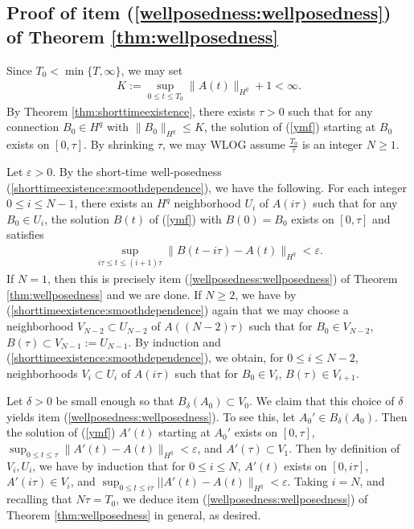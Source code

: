 \documentclass[12pt]{amsart}
\renewcommand{\1}{{\mathbf 1}}
\theoremstyle{others}
\numberwithin{equation}{section}
\begin{document}
\subsection{Proof of item (\ref{wellposedness:wellposedness}) of Theorem \ref{thm:wellposedness}} \label{item1proof}
 Since \(T_0 < \min\{T, \infty\}\), we may set
   \begin{align*}
       K := \sup_{0 \leq t \leq T_0} \|A(t)\|_{H^q}+1 < \infty.
   \end{align*} By Theorem \ref{thm:shorttimeexistence}, there exists \(\tau > 0\) such that for any connection \(B_0 \in H^q\) with \(\|B_0\|_{H^q} \leq K\), the solution of (\ref{ymf}) starting at \(B_0\) exists on \([0, \tau]\). By shrinking \(\tau\), we may WLOG assume \(\frac{T_0}{\tau}\) is an integer \(N \geq 1\). \par 
   Let \(\varepsilon > 0\). By the short-time well-posedness (\ref{shorttimeexistence:smoothdependence}),  we have the following. For each integer \(0 \leq i \leq N-1\), there exists an \(H^q\) neighborhood \(U_i\) of \(A(i\tau)\) such that for any \(B_0 \in U_i\), the solution \(B(t)\) of (\ref{ymf}) with \(B(0) = B_0\) exists on \([0, \tau]\) and satisfies 
   \begin{align*}
       \sup_{i\tau \leq t \leq (i+1)\tau} \|B(t-i\tau) - A(t)\|_{H^q} < \varepsilon.
   \end{align*} If \(N = 1\), then this is precisely item (\ref{wellposedness:wellposedness}) of Theorem \ref{thm:wellposedness} and we are done. If \(N \geq 2\), we have by (\ref{shorttimeexistence:smoothdependence}) again that we may choose a neighborhood \(V_{N-2} \subset U_{N-2}\) of \(A((N-2)\tau)\) such that for 
   \(B_0 \in V_{N-2}\), \(B(\tau) \subset V_{N-1} := U_{N-1}\). By induction and (\ref{shorttimeexistence:smoothdependence}), we obtain, for \(0 \leq i \leq N-2\), neighborhoods \(V_i \subset U_i\) of \(A(i\tau)\) such that for \(B_0 \in V_i\), \(B(\tau) \in V_{i+1}\). \par
   Let \(\delta > 0\) be small enough so that \(B_\delta(A_0) \subset V_0\). We claim that this choice of \(\delta\) yields item (\ref{wellposedness:wellposedness}). To see this, let \(A_0' \in B_{\delta}(A_0)\). Then the solution of (\ref{ymf}) \(A'(t)\) starting at \(A_0'\) exists on \([0, \tau]\), \(\sup_{0 \leq t \leq \tau} \|A'(t) - A(t)\|_{H^q} < \varepsilon\), and \(A'(\tau) \subset V_1\). Then by definition of \(V_i, U_i\), we have by induction that for \(0 \leq i \leq N\), \(A'(t)\) exists on \([0, i\tau]\), \(A'(i\tau) \in V_i\), and \(\sup_{0 \leq t \leq i\tau} ||A'(t) - A(t)\|_{H^q} < \varepsilon\). Taking \(i = N\), and recalling that \(N\tau = T_0\), we deduce item (\ref{wellposedness:wellposedness}) of Theorem \ref{thm:wellposedness} in general, as desired.
\end{document}
